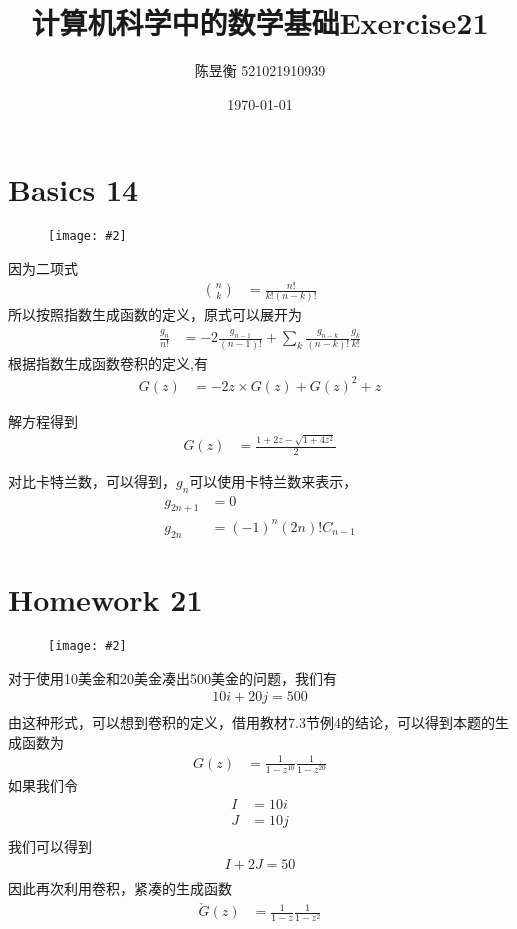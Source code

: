 \documentclass[]{article}
\title{计算机科学中的数学基础Exercise21}
\author{陈昱衡 521021910939}
\date{\today}
\newcommand{\image}[2]{\begin{figure}[H]\texttt{[image: \#2]}\end{figure}}
\begin{document}
\maketitle

\section*{Basics 14}
\image{0.5}{2023-05-11-11-15-49.png}
因为二项式
\begin{align}
    \binom{n}{k} &= \frac{n!}{k!(n-k)!}
\end{align}
所以按照指数生成函数的定义，原式可以展开为
\begin{align}
    \frac{g_n}{n!} &= -2\frac{g_{n-1}}{(n-1)!} + \sum_{k} \frac{g_{n-k}}{(n-k)!}\frac{g_k}{k!}
\end{align}
根据指数生成函数卷积的定义,有
\begin{align}
    G(z) &= -2z\times G(z) + G(z)^{2} + z
\end{align}

解方程得到
\begin{align}
    G(z) &= \frac{1+2z-\sqrt{1+4z^2}}{2}
\end{align}

对比卡特兰数，可以得到，$g_n$可以使用卡特兰数来表示，
\begin{align}
    g_{2n+1} &= 0\\
    g_{2n} &= (-1)^n(2n)!C_{n-1}
\end{align}

\section*{Homework 21}
\image{0.5}{2023-05-11-11-16-06.png}
对于使用10美金和20美金凑出500美金的问题，我们有
\begin{align}
    10i+20j=500\\
\end{align}
由这种形式，可以想到卷积的定义，借用教材7.3节例4的结论，可以得到本题的生成函数为
\begin{align}
    G(z) &= \frac{1}{1-z^{10}}\frac{1}{1-z^{20}}
\end{align}
如果我们令
\begin{align}
    I &= 10i\\
    J &= 10j \\
\end{align}
我们可以得到
\begin{align}
    I + 2J = 50\\
\end{align}
因此再次利用卷积，紧凑的生成函数
\begin{align}
    \check{G}(z) &= \frac{1}{1-z}\frac{1}{1-z^2}
\end{align}
\end{document}
